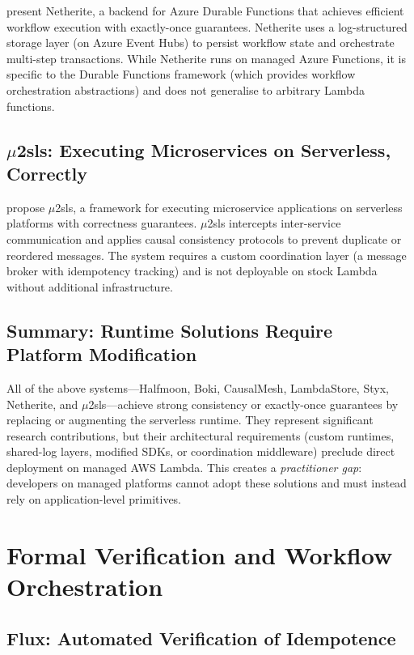 \citet{Burckhardt2022Netherite} present Netherite, a backend for Azure Durable Functions that achieves efficient workflow execution with exactly-once guarantees. Netherite uses a log-structured storage layer (on Azure Event Hubs) to persist workflow state and orchestrate multi-step transactions. While Netherite runs on managed Azure Functions, it is specific to the Durable Functions framework (which provides workflow orchestration abstractions) and does not generalise to arbitrary Lambda functions.

\subsection{$\mu$2sls: Executing Microservices on Serverless, Correctly}

\citet{Kallas2023Mu2sls} propose $\mu$2sls, a framework for executing microservice applications on serverless platforms with correctness guarantees. $\mu$2sls intercepts inter-service communication and applies causal consistency protocols to prevent duplicate or reordered messages. The system requires a custom coordination layer (a message broker with idempotency tracking) and is not deployable on stock Lambda without additional infrastructure.

\subsection{Summary: Runtime Solutions Require Platform Modification}

All of the above systems---Halfmoon, Boki, CausalMesh, LambdaStore, Styx, Netherite, and $\mu$2sls---achieve strong consistency or exactly-once guarantees by replacing or augmenting the serverless runtime. They represent significant research contributions, but their architectural requirements (custom runtimes, shared-log layers, modified SDKs, or coordination middleware) preclude direct deployment on managed AWS Lambda. This creates a \textit{practitioner gap}: developers on managed platforms cannot adopt these solutions and must instead rely on application-level primitives.

\section{Formal Verification and Workflow Orchestration}

\subsection{Flux: Automated Verification of Idempotence}

